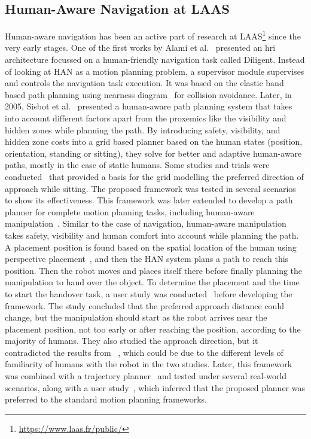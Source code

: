 \subsection{Human-Aware Navigation at LAAS}
Human-aware navigation has been an active part of research at LAAS\footnote{\url{https://www.laas.fr/public/}} since the very early stages. One of the first works by Alami et al.~\cite{alami_diligent_2000} presented an \acrshort{hri} architecture focussed on a human-friendly navigation task called Diligent. Instead of looking at HAN as a motion planning problem, a supervisor module supervises and controls the navigation task execution. It was based on the elastic band based path planning using nearness diagram~\cite{minguez2000nearness} for collision avoidance. Later, in 2005, Sisbot et al.~\cite{sisbot_navigation_2005} presented a human-aware path planning system that takes into account different factors apart from the proxemics like the visibility and hidden zones while planning the path. By introducing safety, visibility, and hidden zone costs into a grid based planner based on the human states (position, orientation, standing or sitting), they solve for better and adaptive human-aware paths, mostly in the case of static humans. Some studies and trials were conducted~\cite{dautenhahn_how_2006} that provided a basis for the grid modelling the preferred direction of approach while sitting. The proposed framework was tested in several scenarios~\cite{sisbot_mobile_2006, sisbot_human_2007} to show its effectiveness. This framework was later extended to develop a path planner for complete motion planning tasks, including human-aware manipulation~\cite{sisbot_spatial_2007}. Similar to the case of navigation, human-aware manipulation takes safety, visibility and human comfort into account while planning the path. A placement position is found based on the spatial location of the human using perspective placement~\cite{sisbot_spatial_2007}, and then the HAN system plans a path to reach this position. Then the robot moves and places itself there before finally planning the manipulation to hand over the object. To determine the placement and the time to start the handover task, a user study was conducted~\cite{koay2007exploratory} before developing the framework. The study concluded that the preferred approach distance could change, but the manipulation should start as the robot arrives near the placement position, not too early or after reaching the position, according to the majority of humans. They also studied the approach direction, but it contradicted the results from ~\cite{dautenhahn_how_2006}, which could be due to the different levels of familiarity of humans with the robot in the two studies. Later, this framework was combined with a trajectory planner~\cite{sisbot_synthesizing_2010} and tested under several real-world scenarios, along with a user study~\cite{dehais_physiological_2011}, which inferred that the proposed planner was preferred to the standard motion planning frameworks.

